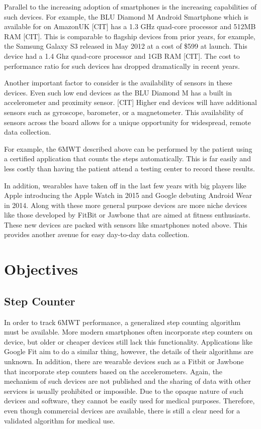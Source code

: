             Parallel to the increasing adoption of smartphones is the increasing capabilities of such devices. For example, the BLU Diamond M Android Smartphone which is available for  on AmazonUK [CIT] has a 1.3 GHz quad-core processor and 512MB RAM [CIT]. This is comparable to flagship devices from prior years, for example, the Samsung Galaxy S3 released in May 2012 at a cost of \$599 at launch. This device had a 1.4 Ghz quad-core processor and 1GB RAM [CIT]. The cost to performance ratio for such devices has dropped dramatically in recent years.

            Another important factor to consider is the availability of sensors in these devices. Even such low end devices as the BLU Diamond M has a built in accelerometer and proximity sensor. [CIT] Higher end devices will have additional sensors such as gyroscope, barometer, or a magnetometer. This availability of sensors across the board allows for a unique opportunity for widespread, remote data collection. 

            For example, the 6MWT described above can be performed by the patient using a certified application that counts the steps automatically. This is far easily and less costly than having the patient attend a testing center to record these results.

            In addition, wearables have taken off in the last few years with big players like Apple introducing the Apple Watch in 2015 and Google debuting Android Wear in 2014. Along with these more general purpose devices are more niche devices like those developed by FitBit or Jawbone that are aimed at fitness enthusiasts. These new devices are packed with sensors like smartphones noted above. This provides another avenue for easy day-to-day data collection.

    \chapter{Objectives}

        \section{Step Counter}

            In order to track 6MWT performance, a generalized step counting algorithm must be available. More modern smartphones often incorporate step counters on device, but older or cheaper devices still lack this functionality. Applications like Google Fit aim to do a similar thing, however, the details of their algorithms are unknown. In addition, there are wearable devices such as a Fitbit or Jawbone that incorporate step counters based on the accelerometers. Again, the mechanism of such devices are not published and the sharing of data with other services is usually prohibited or impossible. Due to the opaque nature of such devices and software, they cannot be easily used for medical purposes. Therefore, even though commercial devices are available, there is still a clear need for a validated algorithm for medical use.

